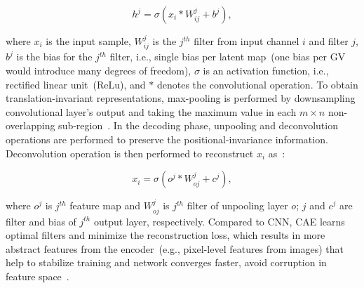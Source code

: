 \begin{equation}
    h^{j}=\sigma\left(x_{i} * W_{ij}^{j}+b^{j}\right),
\end{equation}

\hspace*{3.5mm} where $x_i$ is the input sample, $W_{ij}^{j}$ is the $j^{th}$ filter from input channel $i$ and filter $j$, $b^j$ is the bias for the $j^{th}$ filter, i.e., single bias per latent map~(one bias per GV would introduce many degrees of freedom), $\sigma$ is an activation function, i.e., rectified linear unit~(ReLu), and $*$ denotes the convolutional operation. To obtain translation-invariant representations, max-pooling is performed by downsampling convolutional layer's output and taking the maximum value in each $m \times n$ non-overlapping sub-region~\cite{alirezaie2019semantic}. In the decoding phase, unpooling and deconvolution operations are performed to preserve the positional-invariance information. Deconvolution operation is then performed to reconstruct $x_i$ as~\cite{alirezaie2019semantic}:

\begin{equation}
   x_i = \sigma\left(o^{j} * W_{oj}^{j}+c^{j}\right),
\end{equation}

\hspace*{3.5mm} where $o^j$ is $j^{th}$ feature map and $W_{oj}^{j}$ is $j^{th}$ filter of unpooling layer $o$; $j$ and $c^j$ are filter and bias of $j^{th}$ output layer, respectively. Compared to CNN, CAE learns optimal filters and minimize the reconstruction loss, which results in more abstract features from the encoder~(e.g., pixel-level features from images) that help to stabilize training and network converges faster, avoid corruption in feature space~\cite{guo2017deep}. 

